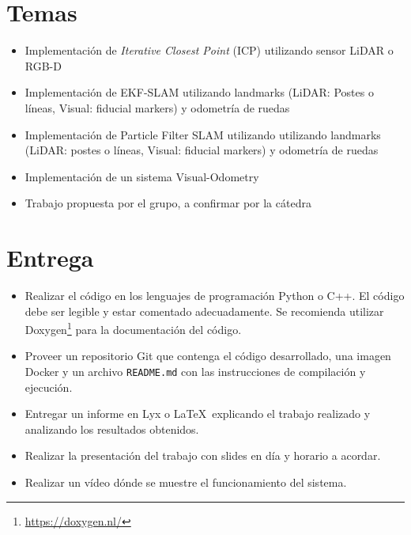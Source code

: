 \documentclass[tp]{lcc}
\begin{document}
	\maketitle
	
	
	\section{Temas}
	\begin{itemize}
		
		\item Implementación de \emph{Iterative Closest Point} (ICP) utilizando sensor LiDAR o RGB-D
		\item Implementación de EKF-SLAM utilizando landmarks (LiDAR: Postes o líneas, Visual: fiducial markers) y odometría de ruedas
		\item Implementación de Particle Filter SLAM utilizando utilizando landmarks (LiDAR: postes o líneas, Visual: fiducial markers) y odometría de ruedas
		\item Implementación de un sistema Visual-Odometry
		\item Trabajo propuesta por el grupo, a confirmar por la cátedra
	
	\end{itemize}
		
	\section{Entrega}
	\begin{itemize}
		
		\item Realizar el código en los lenguajes de programación Python o C++. El código debe ser legible y estar comentado adecuadamente. Se recomienda utilizar Doxygen\footnote{\url{https://doxygen.nl/}} para la documentación del código.
		
		\item Proveer un repositorio Git que contenga el código desarrollado, una imagen Docker y un archivo \lstinline{README.md} con las instrucciones de compilación y ejecución.
		
		\item Entregar un informe en Lyx o \LaTeX\  explicando el trabajo realizado y analizando los resultados obtenidos.
		
		\item Realizar la presentación del trabajo con slides en día y horario a acordar.
        
        \item Realizar un vídeo dónde se muestre el funcionamiento del sistema.         
	\end{itemize}
\end{document}
